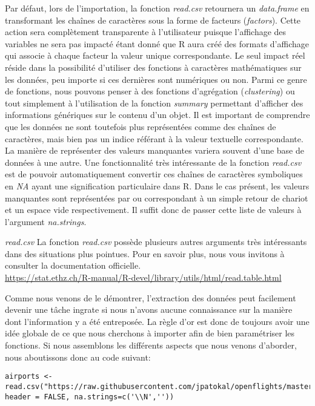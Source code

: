 Par défaut, lors de l'importation, la fonction \emph{read.csv} retournera un \emph{data.frame} en transformant les chaînes de caractères sous la forme de facteurs (\emph{factors}). Cette action sera complètement transparente à l'utilisateur puisque l'affichage des variables ne sera pas impacté étant donné que R aura créé des formats d'affichage qui associe à chaque facteur la valeur unique correspondante. Le seul impact réel réside dans la possibilité d'utiliser des fonctions à caractères mathématiques sur les données, peu importe si ces dernières sont numériques ou non. Parmi ce genre de fonctions, nous pouvons penser à des fonctions d'agrégation (\emph{clustering}) ou tout simplement à l'utilisation de la fonction \emph{summary} \cite{Rfunction:summary} permettant d'afficher des informations génériques sur le contenu d'un objet. Il est important de comprendre que les données ne sont toutefois plus représentées comme des chaînes de caractères, mais bien pas un indice référant à la valeur textuelle correspondante. \\

La manière de représenter des valeurs manquantes variera souvent d'une base de données à une autre. Une fonctionnalité très intéressante de la fonction \emph{read.csv} est de pouvoir automatiquement convertir ces chaînes de caractères symboliques en \emph{NA} ayant une signification particulaire dans R. Dans le cas présent, les valeurs manquantes sont représentées par  ou  correspondant à un simple retour de chariot et un espace vide respectivement. Il suffit donc de passer cette liste de valeurs à l'argument \emph{na.strings}. \\

\begin{moreInfo}{\emph{read.csv}}
	La fonction \emph{read.csv} possède plusieurs autres arguments très intéressants dans des situations plus pointues. Pour en savoir plus, nous vous invitons à consulter la documentation officielle. \\
	\url{https://stat.ethz.ch/R-manual/R-devel/library/utils/html/read.table.html}
\end{moreInfo}

Comme nous venons de le démontrer, l'extraction des données peut facilement devenir une tâche ingrate si nous n'avons aucune connaissance sur la manière dont l'information y a été entreposée. La règle d'or est donc de toujours avoir une idée globale de ce que nous cherchons à importer afin de bien paramétriser les fonctions. Si nous assemblons les différents aspects que nous venons d'aborder, nous aboutissons donc au code suivant:
\begin{lstlisting}[caption = Extraction des données,label=src:Extraction]
	airports <- read.csv("https://raw.githubusercontent.com/jpatokal/openflights/master/data/airports.dat", header = FALSE, na.strings=c('\\N',''))
\end{lstlisting}